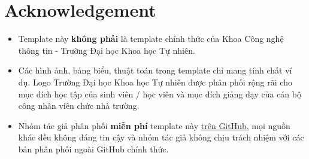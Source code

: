 \section{Acknowledgement}
\begin{itemize}
\item Template này \textbf{không phải} là template chính thức của Khoa Công nghệ thông tin - Trường Đại học Khoa học Tự nhiên.
\item Các hình ảnh, bảng biểu, thuật toán trong template chỉ mang tính chất ví dụ. Logo Trường Đại học Khoa học Tự nhiên được phân phối rộng rãi cho mục đích học tập của sinh viên / học viên và mục đích giảng dạy của cán bộ công nhân viên chức nhà trường.
\item Nhóm tác giả phân phối \textbf{miễn phí} template này \href{https://github.com/khongsomeo/latex-products}{trên GitHub}, mọi nguồn khác đều không đáng tin cậy và nhóm tác giả không chịu trách nhiệm với các bản phân phối ngoài GitHub chính thức.
\end{itemize}
